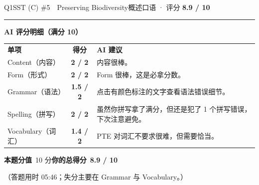 \documentclass[11pt]{article}
\newcommand{\sfull}[1]{\textcolor{cFix}{\bfseries #1}}     %
\newcommand{\spart}[1]{\textcolor{cPartial}{\bfseries #1}} %
\newcommand{\ptesub}[1]{%
  \par\needspace{2\baselineskip}\smallskip
  {\color{cAccent}\rule[-0.2ex]{3pt}{1.05em}}\hspace{6pt}%
  {\bfseries\color{cHead}#1}\par\nopagebreak\smallskip}
\begin{document}
\begin{qblock}{Q1\quad SST (C) \#5\ \ Preserving Biodiversity}{概述口语 · 评分 \textcolor{cAccent}{\bfseries 8.9 / 10}}
\ptesub{AI 评分明细（满分 10）}
\begin{notebox}
{\renewcommand{\arraystretch}{1.35}
\begin{tabularx}{\linewidth}{@{}l c Z@{}}
\textbf{单项} & \textbf{得分} & \textbf{AI 建议}\\[2pt]
Content（内容）& \sfull{2 / 2} & 内容很棒。\\
Form（形式）& \sfull{2 / 2} & Form 很棒，这是必拿分数。\\
Grammar（语法）& \spart{1.5 / 2} & 点击有颜色标注的文字查看语法错误细节。\\
Spelling（拼写）& \sfull{2 / 2} & 虽然你拼写拿了满分，但还是犯了 1 个拼写错误，下次注意避免。\\
Vocabulary（词汇）& \spart{1.4 / 2} & PTE 对词汇不要求很难，但需要恰当。\\
\end{tabularx}}
\smallskip
\textbf{本题分值}\ 10 分\qquad\textbf{你的总得分}\ \textcolor{cAccent}{\bfseries 8.9 / 10}
\end{notebox}
\smallskip
{\footnotesize\color{gray}（答题用时 05:46；失分主要在 Grammar 与 Vocabulary。）}
\end{qblock}
\end{document}
